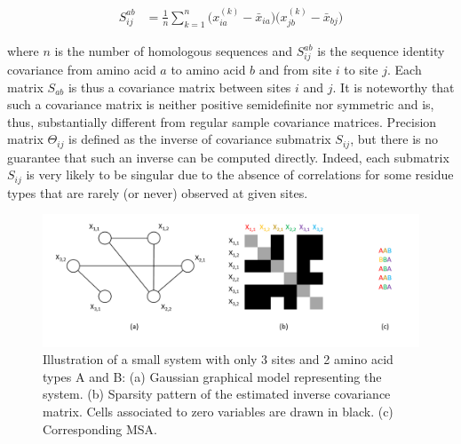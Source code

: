         \begin{equation} \label{covariance}
            \begin{split}
                S_{ij}^{ab} & = \frac{1}{n} \sum\limits_{k=1}^{n} \big( x_{ia}^{(k)} - \bar{x}_{ia} \big) \big( x_{jb}^{(k)} - \bar{x}_{bj} \big)
            \end{split}
        \end{equation}

        where $n$ is the number of
        homologous sequences and $S_{ij}^{ab}$ is the sequence identity covariance from amino acid $a$ to amino acid $b$ and from site $i$ to site $j$.
        Each matrix $S_{ab}$ is thus a covariance matrix between sites $i$ and $j$. It is noteworthy that such a covariance matrix is neither positive
        semidefinite nor symmetric and is, thus, substantially different from regular sample covariance matrices. Precision matrix $\Theta_{ij}$ is defined as
        the inverse of covariance submatrix $S_{ij}$, but there is no guarantee that such an inverse can be computed directly. Indeed, each submatrix
        $S_{ij}$ is very likely to be singular due to the absence of correlations for some residue types that are rarely (or never) observed at given sites.

        \begin{figure}[H]
            \begin{center}
                \includegraphics[width=\textwidth, keepaspectratio]{imgs/ggm.png}
                \caption{Illustration of a small system with only 3 sites and 2 amino acid types A and B:
                    (a) Gaussian graphical model representing the system.
                    (b) Sparsity pattern of the estimated inverse covariance matrix.
                    Cells associated to zero variables are drawn in black. (c) Corresponding MSA.}
                \label{thresholds}
            \end{center}
        \end{figure}

